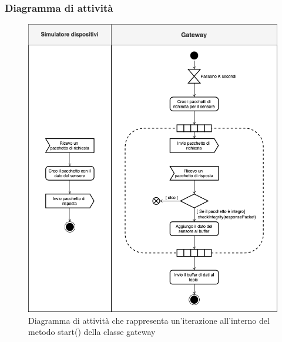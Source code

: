	\subsubsection{Diagramma di attività}%
		\begin{figure}[H]
			\centering
			\includegraphics[scale=0.500]{res/images/GATEWAY/gateway.start().png}
			\caption{Diagramma di attività che rappresenta un'iterazione all'interno del metodo start() della classe gateway}
			\label{Diagramma 4}
		\end{figure}